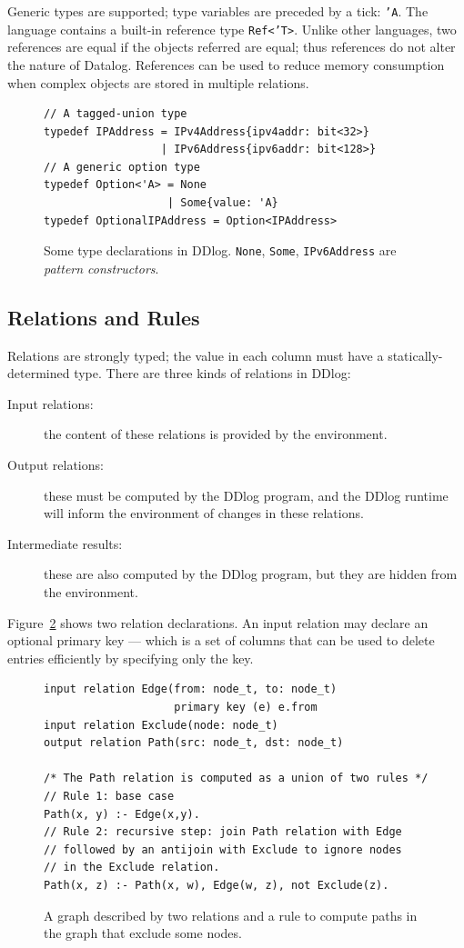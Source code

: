 Generic types are supported; type variables are preceded by a tick:
\texttt{'A}.  The language contains a built-in reference type
\texttt{Ref<'T>}.  Unlike other languages, two references are equal if
the objects referred are equal; thus references do not alter the
nature of Datalog.  References can be used to reduce memory
consumption when complex objects are stored in multiple relations.

\begin{figure}[t]
  \footnotesize
\begin{lstlisting}[language=ddlog]
// A tagged-union type
typedef IPAddress = IPv4Address{ipv4addr: bit<32>}
                  | IPv6Address{ipv6addr: bit<128>}
// A generic option type
typedef Option<'A> = None
                   | Some{value: 'A}
typedef OptionalIPAddress = Option<IPAddress>
\end{lstlisting}
\caption{Some type declarations in DDlog.  \texttt{None}, \texttt{Some},
\texttt{IPv6Address} are \emph{pattern constructors}.\label{fig:types}}
\end{figure}

\subsection{Relations and Rules}

Relations are strongly typed; the value in each column must have a
statically-determined type.  There are three kinds of relations in
DDlog:
\begin{description}
\item[Input relations:] the content of these relations is provided by
  the environment.
\item[Output relations:] these must be computed by the DDlog program, and the
  DDlog runtime will inform the environment of changes in these relations.
\item[Intermediate results:] these are also computed by the DDlog
  program, but they are hidden from the environment.
\end{description}

Figure~\ref{fig:relations-rules} shows two relation declarations.  An
input relation may declare an optional primary key --- which is a set
of columns that can be used to delete entries efficiently by
specifying only the key.

\begin{figure}[t]
  \small
  \begin{lstlisting}[language=ddlog]
input relation Edge(from: node_t, to: node_t)
                    primary key (e) e.from
input relation Exclude(node: node_t)
output relation Path(src: node_t, dst: node_t)

/* The Path relation is computed as a union of two rules */
// Rule 1: base case
Path(x, y) :- Edge(x,y).
// Rule 2: recursive step: join Path relation with Edge
// followed by an antijoin with Exclude to ignore nodes
// in the Exclude relation.
Path(x, z) :- Path(x, w), Edge(w, z), not Exclude(z).
  \end{lstlisting}
  \caption{A graph described by two relations and a rule to compute
    paths in the graph that exclude some nodes.\label{fig:relations-rules}}
\end{figure}

